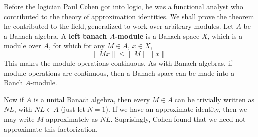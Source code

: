 Before the logician Paul Cohen got into logic, he was a functional analyst who contributed to the theory of approximation identities. We shall prove the theorem he contributed to the field, generalized to work over arbitrary modules. Let $A$ be a Banach algebra. A {\bf left banach $A$-module} is a Banach space $X$, which is a module over $A$, for which for any $M \in A$, $x \in X$,
%
\[ \| Mx \| \leq \| M \| \| x \| \]
%
This makes the module operations continuous. As with Banach algebras, if module operations are continuous, then a Banach space can be made into a Banch $A$-module.

Now if $A$ is a unital Banach algebra, then every $M \in A$ can be trivially written as $NL$, with $NL \in A$ (just let $N = 1$). If we have an approximate identity, then we may write $M$ approximately as $NL$. Suprisingly, Cohen found that we need not approximate this factorization.

